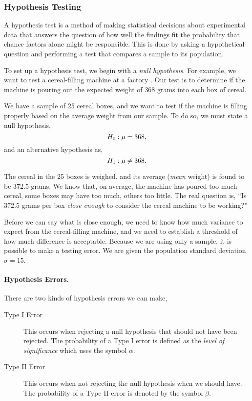 \subsubsection{Hypothesis Testing}\label{hyp-test}
A hypothesis test is a method of making statistical decisions about experimental data that answers the question of how well the findings fit the probability that chance factors alone might be responsible. This is done by asking a hypothetical question and performing a test that compares a sample to its population.

To set up a hypothesis test, we begin with a \emph{null hypothesis}. For example, we want to test a cereal-filling machine at a factory \cite[pp. 332--358]{levine-2004sme}. Our test is to determine if the machine is pouring out the expected weight of 368 grams into each box of cereal.

We have a sample of 25 cereal boxes, and we want to test if the machine is filling properly based on the average weight from our sample. To do so, we must state a null hypothesis,
\[
H_0 : \mu=368,\index{null hypothesis}\index{H0@$H_0$|see{null hypothesis}}
\]
and an alternative hypothesis as,
\[
H_1 : \mu \ne 368. \index{alternative hypothesis}\index{H1@$H_1$|see{alternative hypothesis}}
\]

The cereal in the 25 boxes is weighed, and its average (\emph{mean} weight) is found to be 372.5 grams. We know that, on average, the machine has poured too much cereal, some boxes may have too much, others too little. The real question is, ``Is 372.5 grams per box \emph{close enough} to consider the cereal machine to be working?''

Before we can say what is close enough, we need to know how much variance to expect from the cereal-filling machine, and we need to establish a threshold of how much difference is acceptable. Because we are using only a sample, it is possible to make a testing error. We are given the population standard deviation $\sigma=15$.

\paragraph{Hypothesis Errors.}There are two kinds of hypothesis errors we can make,
\begin{description}
\item[Type I Error] This occurs when rejecting a null hypothesis that should not have been rejected. The probability of a Type I error is defined as the \emph{level of significance} which uses the symbol $\alpha$.
\item[Type II Error] This occurs when not rejecting the null hypothesis when we should have. The probability of a Type II error is denoted by the symbol $\beta$.
\end{description}

